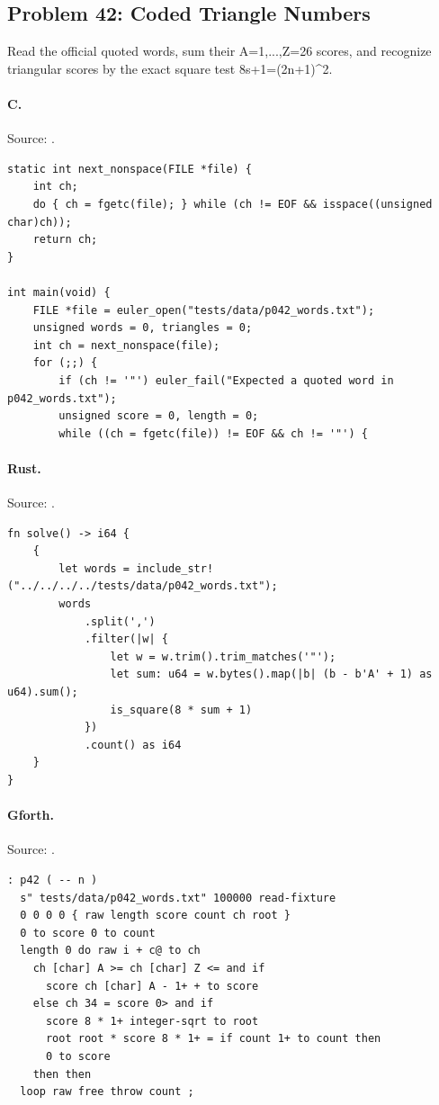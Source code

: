 \subsection{Problem 42: Coded Triangle Numbers}
\label{walkthrough:p42}
Read the official quoted words, sum their A=1,...,Z=26 scores, and recognize triangular scores by the exact square test 8s+1=(2n+1)\textasciicircum{}2.

\paragraph{C.} Source: .
\begin{lstlisting}
static int next_nonspace(FILE *file) {
    int ch;
    do { ch = fgetc(file); } while (ch != EOF && isspace((unsigned char)ch));
    return ch;
}

int main(void) {
    FILE *file = euler_open("tests/data/p042_words.txt");
    unsigned words = 0, triangles = 0;
    int ch = next_nonspace(file);
    for (;;) {
        if (ch != '"') euler_fail("Expected a quoted word in p042_words.txt");
        unsigned score = 0, length = 0;
        while ((ch = fgetc(file)) != EOF && ch != '"') {
\end{lstlisting}

\paragraph{Rust.} Source: .
\begin{lstlisting}
fn solve() -> i64 {
    {
        let words = include_str!("../../../../tests/data/p042_words.txt");
        words
            .split(',')
            .filter(|w| {
                let w = w.trim().trim_matches('"');
                let sum: u64 = w.bytes().map(|b| (b - b'A' + 1) as u64).sum();
                is_square(8 * sum + 1)
            })
            .count() as i64
    }
}
\end{lstlisting}

\paragraph{Gforth.} Source: .
\begin{lstlisting}
: p42 ( -- n )
  s" tests/data/p042_words.txt" 100000 read-fixture
  0 0 0 0 { raw length score count ch root }
  0 to score 0 to count
  length 0 do raw i + c@ to ch
    ch [char] A >= ch [char] Z <= and if
      score ch [char] A - 1+ + to score
    else ch 34 = score 0> and if
      score 8 * 1+ integer-sqrt to root
      root root * score 8 * 1+ = if count 1+ to count then
      0 to score
    then then
  loop raw free throw count ;
\end{lstlisting}

